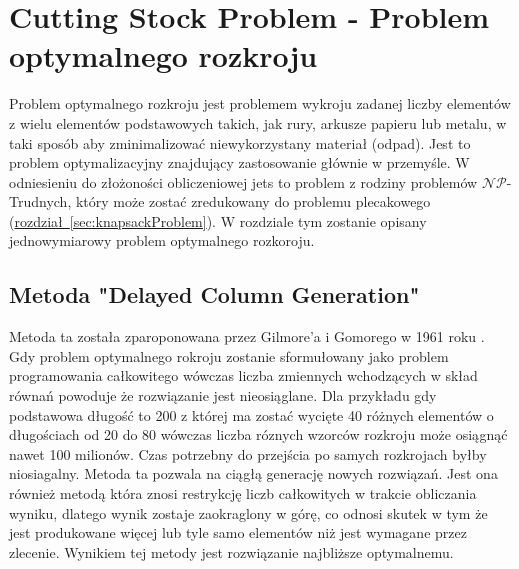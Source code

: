 \section{Cutting Stock Problem - Problem optymalnego rozkroju}
\label{sec:cuttingStockProblem}
\newcommand{\mf}[1]{\textbf{\textit{#1}}}
\newcommand{\tsub}[1]{\textsubscript{#1}}
\newcommand{\tsuper}[1]{\textsuperscript{#1}}

Problem optymalnego rozkroju jest problemem wykroju zadanej liczby elementów z wielu elementów podstawowych takich, jak rury, arkusze papieru lub metalu, w taki sposób aby zminimalizować niewykorzystany materiał (odpad). Jest to problem optymalizacyjny znajdujący zastosowanie głównie w przemyśle.  W odniesieniu do  złożoności obliczeniowej jets to problem z rodziny problemów $\mathcal{NP}$-Trudnych, który może zostać zredukowany do problemu plecakowego (\hyperref[sec:knapsackProblem]{rozdział~\ref*{sec:knapsackProblem}}). W rozdziale tym zostanie opisany jednowymiarowy problem optymalnego rozkoroju.

\subsection{Metoda "Delayed Column Generation"}
Metoda ta została zparoponowana przez Gilmore'a i Gomorego w 1961 roku \cite{GilmoreGomoryV1Article}. Gdy problem optymalnego rokroju zostanie sformułowany jako problem programowania całkowitego wówczas liczba zmiennych wchodzących w skład równań powoduje że rozwiązanie jest nieosiąglane. Dla przykładu gdy podstawowa długość to 200 z której ma zostać wycięte 40 różnych elementów o długościach od 20 do 80 wówczas liczba róznych wzorców rozkroju może osiągnąć nawet 100 milionów. Czas potrzebny do przejścia po samych rozkrojach byłby niosiagalny. Metoda ta pozwala na ciągłą generację nowych rozwiązań. Jest ona również metodą która znosi restrykcję liczb całkowitych w trakcie obliczania wyniku, dlatego wynik zostaje zaokraglony w górę, co odnosi skutek w tym że jest produkowane więcej lub tyle samo elementów niż jest wymagane przez zlecenie. Wynikiem tej metody jest rozwiązanie najbliższe optymalnemu.
